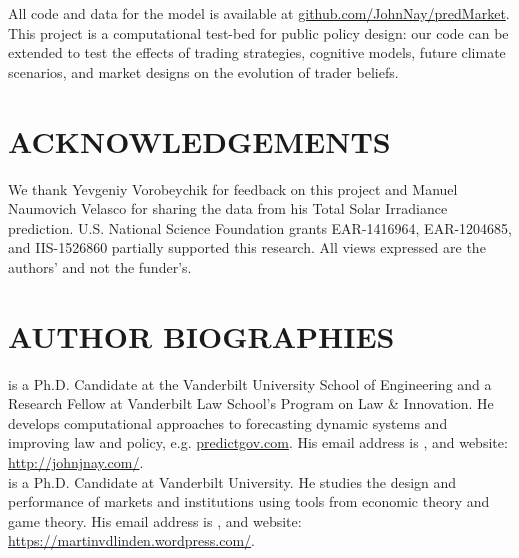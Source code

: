 \documentclass{wscpaperproc}\usepackage[]{graphicx}\usepackage[]{color}
\begin{document}
All code and data for the model is available at \href{https://github.com/JohnNay/predMarket}{github.com/JohnNay/predMarket}. This project is a computational test-bed for public policy design: our code can be extended to test the effects of trading strategies, cognitive models, future climate scenarios, and market designs on the evolution of trader beliefs.

\section*{ACKNOWLEDGEMENTS}

We thank Yevgeniy Vorobeychik for feedback on this project and Manuel Naumovich Velasco for sharing the data from his Total Solar Irradiance prediction.
U.S. National Science Foundation grants EAR-1416964, EAR-1204685, and IIS-1526860 partially supported this research.
All views expressed are the authors' and not the funder's.




\section*{AUTHOR BIOGRAPHIES}

 is a Ph.D. Candidate at the Vanderbilt University School of Engineering and a Research Fellow at Vanderbilt Law School's Program on Law \& Innovation. He develops computational approaches to forecasting dynamic systems and improving law and policy, e.g. \href{http://predictgov.com/}{predictgov.com}. His email address is , and website: \href{http://johnjnay.com/}{http://johnjnay.com/}.\\

 is a Ph.D. Candidate at Vanderbilt University. He studies the design and performance of markets and institutions using tools from economic theory and game theory.
His email address is , and website: \href{https://martinvdlinden.wordpress.com/}{https://martinvdlinden.wordpress.com/}.\\
\end{document}
